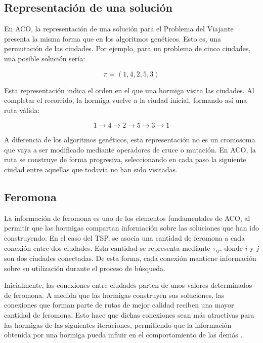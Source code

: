 \subsection{Representación de una solución}
\label{subsec:aco_rep}

En ACO, la representación de una solución para el Problema del Viajante presenta la misma forma que en los algoritmos genéticos.
Esto es, una permutación de las ciudades. Por ejemplo, para un problema de cinco ciudades, una posible solución sería:

\begin{equation}
  \pi = (1, 4, 2, 5, 3)  
\end{equation}

Esta representación indica el orden en el que una hormiga visita las ciudades. Al completar el recorrido, la hormiga vuelve a 
la ciudad inicial, formando así una ruta válida:

\begin{equation}
  1 \xrightarrow{}4 \xrightarrow{} 2 \xrightarrow{} 5 \xrightarrow{} 3 \xrightarrow{} 1
\end{equation}

A diferencia de los algoritmos genéticos, esta representación no es un cromosoma que vaya a ser modificado mediante operadores
de cruce o mutación. En ACO, la ruta se construye de forma progresiva, seleccionando en cada paso la siguiente ciudad entre 
aquellas que todavía no han sido visitadas.

\subsection{Feromona}
\label{subsec:aco_pheromone}

La información de feromona es uno de los elementos fundamentales de ACO, al permitir que las hormigas compartan información
sobre las soluciones que han ido construyendo. En el caso del TSP, se asocia una cantidad de feromona a cada conexión entre
dos ciudades. Esta cantidad se representa mediante $\tau_{ij}$, donde $i$ y $j$ son dos ciudades conectadas. De esta forma, 
cada conexión mantiene información sobre su utilización durante el proceso de búsqueda.

Inicialmente, las conexiones entre ciudades parten de unos valores determinados de feromona. A medida que las hormigas 
construyen sus soluciones, las conexiones que forman parte de rutas de mejor calidad reciben una mayor cantidad de feromona. 
Esto hace que dichas conexiones sean más atractivas para las hormigas de las siguientes iteraciones, permitiendo que la 
información obtenida por una hormiga pueda influir en el comportamiento de las demás \cite{dorigo2006}.

